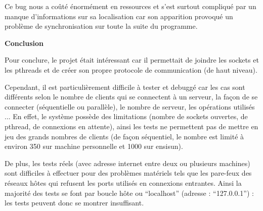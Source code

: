 \documentclass[a4paper,12pt]{article}
\begin{document}
Ce bug nous a coûté énormément en ressources et s'est surtout compliqué par un manque d'informations sur sa localisation car son apparition provoqué un problème de synchronisation sur toute la suite du programme.

\vspace{0.5cm}
\large{\bf Conclusion} \normalsize

Pour conclure, le projet était intéressant car il permettait de joindre les sockets et les pthreads et de créer son propre protocole de communication (de haut niveau). 

Cependant, il est particulièrement difficile à tester et debuggé car les cas sont différents selon le nombre de clients qui se connectent à un serveur, la façon de se connecter (séquentielle ou parallèle), le nombre de serveur, les opérations utilisés ... En effet, le système possède des limitations (nombre de sockets ouvertes, de pthread, de connexions en attente), ainsi  les tests ne permettent pas de mettre en jeu des grands nombres de clients (de façon séquentiel, le nombre est limité à environ 350 sur machine personnelle et 1000 sur ensisun). 

De plus, les tests réels (avec adresse internet entre deux ou plusieurs machines) sont difficiles à effectuer pour des problèmes matériels tels que les pare-feux des réseaux hôtes qui refusent les ports utilisés en connexions entrantes. Ainsi la majorité des tests se font par boucle hôte ou ``localhost'' (adresse : ``127.0.0.1'') : les tests peuvent donc se montrer insuffisant.
\end{document}
